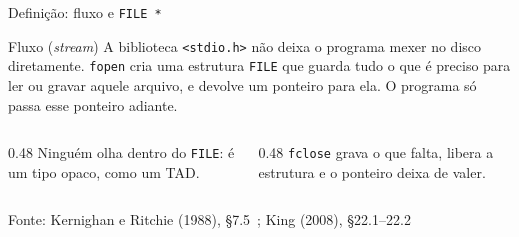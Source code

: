 \documentclass[aspectratio=169]{beamer}
\newcommand{\fonte}[1]{\vfill\hfill{\scriptsize\textcolor{UFSGray}{Fonte: #1}}}
\begin{document}
\begin{frame}{Definição: fluxo e \texttt{FILE *}}
  \begin{center}
  \end{center}
  \begin{block}{Fluxo (\emph{stream})}
    \small A biblioteca \texttt{<stdio.h>} não deixa o programa mexer no disco
    diretamente. \texttt{fopen} cria uma estrutura \texttt{FILE} que guarda
    tudo o que é preciso para ler ou gravar aquele arquivo, e devolve um
    ponteiro para ela. O programa só passa esse ponteiro adiante.
  \end{block}
  \begin{columns}[T]
    \begin{column}{0.48\textwidth}
      \small Ninguém olha dentro do \texttt{FILE}: é um tipo opaco, como um TAD.
    \end{column}
    \begin{column}{0.48\textwidth}
      \small \texttt{fclose} grava o que falta, libera a estrutura e o
      ponteiro deixa de valer.
    \end{column}
  \end{columns}
  \fonte{Kernighan e Ritchie (1988), §7.5~\cite{kernighan1988c};
    King (2008), §22.1--22.2~\cite{king2008c}}
\end{frame}
\end{document}
